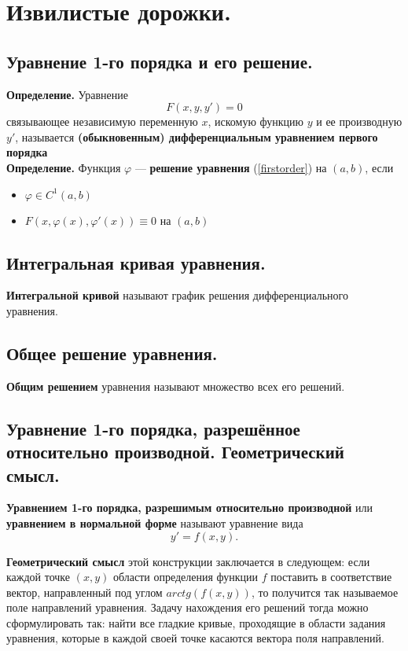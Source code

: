 \documentclass{article}
\begin{document}
\section{Извилистые дорожки.}

\subsection{Уравнение 1-го порядка и его решение.}
\textbf{Определение.} Уравнение
\begin{equation}
    F(x, y, y') = 0 \label{firstorder}
\end{equation}
связывающее независимую переменную $x$, искомую функцию $y$ и ее производную $y'$, называется \textbf{(обыкновенным) дифференциальным уравнением первого порядка}\\

\textbf{Определение.} Функция $\varphi$ --- \textbf{решение уравнения} (\ref{firstorder}) на $(a,b)$, если
\begin{itemize}
    \item $\varphi \in C^1(a,b)$
    \item $F(x, \varphi(x), \varphi'(x)) \equiv 0$ на $(a,b)$
\end{itemize}

\subsection{Интегральная кривая уравнения.}
\textbf{Интегральной кривой} называют график решения дифференциального уравнения.

\subsection{Общее решение уравнения.}
\textbf{Общим решением} уравнения называют множество всех его решений.

\subsection{Уравнение 1-го порядка, разрешённое относительно производной. Геометрический смысл.}
\textbf{Уравнением 1-го порядка, разрешимым относительно производной} или \textbf{уравнением в нормальной форме} называют уравнение вида
\begin{equation*}
    y' = f(x, y).
\end{equation*}

\textbf{Геометрический смысл} этой конструкции заключается в следующем: если каждой точке $(x, y)$ области определения функции $f$ поставить в соответствие вектор, направленный под углом $arctg(f(x, y))$, то получится так называемое поле направлений уравнения. Задачу нахождения его решений тогда можно сформулировать так: найти все гладкие кривые, проходящие в области задания уравнения, которые в каждой своей точке касаются вектора поля направлений.
\end{document}

